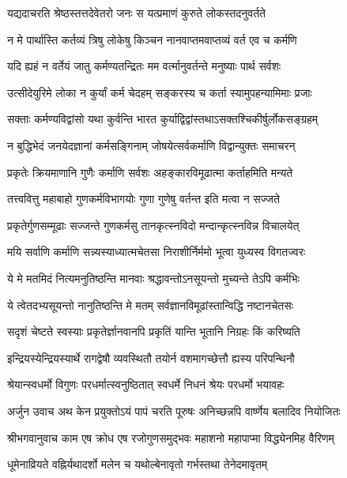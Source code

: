 \twolineshloka
{यद्यदाचरति श्रेष्ठस्तत्तदेवेतरो जनः}
{स यत्प्रमाणं कुरुते लोकस्तदनुवर्तते}%

\twolineshloka
{न मे पार्थास्ति कर्तव्यं त्रिषु लोकेषु किञ्चन}
{नानवाप्तमवाप्तव्यं वर्त एव च कर्मणि}%

\twolineshloka
{यदि ह्यहं न वर्तेयं जातु कर्मण्यतन्द्रितः}
{मम वर्त्मानुवर्तन्ते मनुष्याः पार्थ सर्वशः}%

\twolineshloka
{उत्सीदेयुरिमे लोका न कुर्यां कर्म चेदहम्}
{सङ्करस्य च कर्ता स्यामुपहन्यामिमाः प्रजाः}%

\twolineshloka
{सक्ताः कर्मण्यविद्वांसो यथा कुर्वन्ति भारत}
{कुर्याद्विद्वांस्तथाऽसक्तश्चिकीर्षुर्लोकसङ्ग्रहम्}%

\twolineshloka
{न बुद्धिभेदं जनयेदज्ञानां कर्मसङ्गिनाम्}
{जोषयेत्सर्वकर्माणि विद्वान्युक्तः समाचरन्}%

\twolineshloka
{प्रकृतेः क्रियमाणानि गुणैः कर्माणि सर्वशः}
{अहङ्कारविमूढात्मा कर्ताहमिति मन्यते}%

\twolineshloka
{तत्त्ववित्तु महाबाहो गुणकर्मविभागयोः}
{गुणा गुणेषु वर्तन्त इति मत्वा न सज्जते}%

\twolineshloka
{प्रकृतेर्गुणसम्मूढाः सज्जन्ते गुणकर्मसु}
{तानकृत्स्नविदो मन्दान्कृत्स्नविन्न विचालयेत्}%

\twolineshloka
{मयि सर्वाणि कर्माणि सन्न्यस्याध्यात्मचेतसा}
{निराशीर्निर्ममो भूत्वा युध्यस्व विगतज्वरः}%

\twolineshloka
{ये मे मतमिदं नित्यमनुतिष्ठन्ति मानवाः}
{श्रद्धावन्तोऽनसूयन्तो मुच्यन्ते तेऽपि कर्मभिः}%

\twolineshloka
{ये त्वेतदभ्यसूयन्तो नानुतिष्ठन्ति मे मतम्}
{सर्वज्ञानविमूढांस्तान्विद्धि नष्टानचेतसः}%

\twolineshloka
{सदृशं चेष्टते स्वस्याः प्रकृतेर्ज्ञानवानपि}
{प्रकृतिं यान्ति भूतानि निग्रहः किं करिष्यति}%

\twolineshloka
{इन्द्रियस्येन्द्रियस्यार्थे रागद्वेषौ व्यवस्थितौ}
{तयोर्न वशमागच्छेत्तौ ह्यस्य परिपन्थिनौ}%

\twolineshloka
{श्रेयान्स्वधर्मो विगुणः परधर्मात्स्वनुष्ठितात्}
{स्वधर्मे निधनं श्रेयः परधर्मो भयावहः}%

{अर्जुन उवाच}
\twolineshloka
{अथ केन प्रयुक्तोऽयं पापं चरति पूरुषः}
{अनिच्छन्नपि वार्ष्णेय बलादिव नियोजितः}%

{श्रीभगवानुवाच}
\twolineshloka
{काम एष क्रोध एष रजोगुणसमुद्भवः}
{महाशनो महापाप्मा विद्ध्येनमिह वैरिणम्}%

\twolineshloka
{धूमेनाव्रियते वह्निर्यथादर्शो मलेन च}
{यथोल्बेनावृतो गर्भस्तथा तेनेदमावृतम्}%

